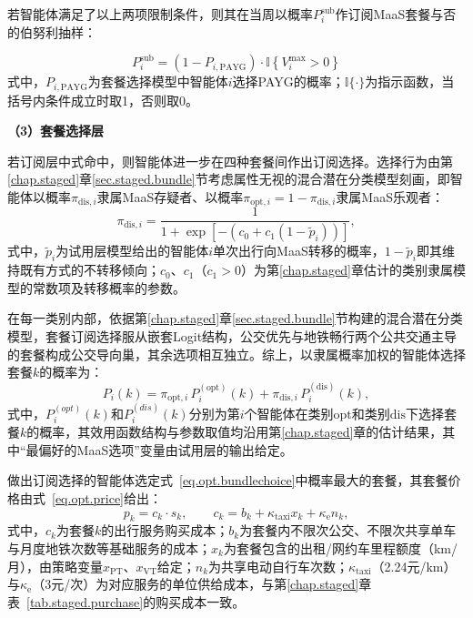 若智能体满足了以上两项限制条件，则其在当周以概率$P_{i}^{\mathrm{sub}}$作订阅MaaS套餐与否的伯努利抽样：

\begin{equation}
P_{i}^{\mathrm{sub}} = \left(1-P_{i,\mathrm{PAYG}}\right)\cdot \mathbb{I}\left\{V_{i}^{\max}>0\right\}
\label{eq.opt.subprob}
\end{equation}
式中，$P_{i,\mathrm{PAYG}}$为套餐选择模型中智能体$i$选择PAYG的概率；$\mathbb{I}\{\cdot\}$为指示函数，当括号内条件成立时取1，否则取0。

\textbf{（3）套餐选择层}

若订阅层中式命中，则智能体进一步在四种套餐间作出订阅选择。选择行为由第\ref{chap.staged}章\ref{sec.staged.bundle}节考虑属性无视的混合潜在分类模型刻画，即智能体以概率$\pi_{\mathrm{dis},i}$隶属MaaS存疑者、以概率$\pi_{\mathrm{opt},i}=1-\pi_{\mathrm{dis},i}$隶属MaaS乐观者：
\begin{equation}
\pi_{\mathrm{dis},i} = \frac{1}{1+\exp\left[-\left(c_{0}+c_{1}\left(1-\tilde{p}_{i}\right)\right)\right]},
\label{eq.opt.membership}
\end{equation}
式中，$\tilde{p}_{i}$为试用层模型给出的智能体$i$单次出行向MaaS转移的概率，$1-\tilde{p}_{i}$即其维持既有方式的不转移倾向；$c_{0}$、$c_{1}$（$c_{1}>0$）为第\ref{chap.staged}章估计的类别隶属模型的常数项及转移概率的参数。

在每一类别内部，依据第\ref{chap.staged}章\ref{sec.staged.bundle}节构建的混合潜在分类模型，套餐订阅选择服从嵌套Logit结构，公交优先与地铁畅行两个公共交通主导的套餐构成公交导向巢，其余选项相互独立。综上，以隶属概率加权的智能体选择套餐$k$的概率为：
\begin{equation}
P_{i}(k) = \pi_{\mathrm{opt},i}\,P_{i}^{(\mathrm{opt})}(k)+\pi_{\mathrm{dis},i}\,P_{i}^{(\mathrm{dis})}(k),
\label{eq.opt.bundlechoice}
\end{equation}
式中，$P_{i}^{(opt)}(k)$和$P_{i}^{(dis)}(k)$分别为第$i$个智能体在类别$\mathrm{opt}$和类别$\mathrm{dis}$下选择套餐$k$的概率，其效用函数结构与参数取值均沿用第\ref{chap.staged}章的估计结果，其中``最偏好的MaaS选项''变量由试用层的输出给定。

做出订阅选择的智能体选定式~\eqref{eq.opt.bundlechoice}中概率最大的套餐，其套餐价格由式~\eqref{eq.opt.price}给出：
\begin{equation}
p_{k} = c_{k}\cdot s_{k},\qquad c_{k} = b_{k}+\kappa_{\mathrm{taxi}}x_{k}+\kappa_{\mathrm{e}}n_{k},
\label{eq.opt.price}
\end{equation}
式中，$c_{k}$为套餐$k$的出行服务购买成本；$b_{k}$为套餐内不限次公交、不限次共享单车与月度地铁次数等基础服务的成本；$x_{k}$为套餐包含的出租/网约车里程额度（km/月），由策略变量$x_{\mathrm{PT}}$、$x_{\mathrm{VT}}$给定；$n_{k}$为共享电动自行车次数；$\kappa_{\mathrm{taxi}}$（2.24元/km）与$\kappa_{\mathrm{e}}$（3元/次）为对应服务的单位供给成本，与第\ref{chap.staged}章表~\ref{tab.staged.purchase}的购买成本一致。

